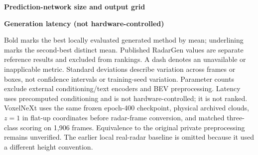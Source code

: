 \begin{table}[t]
\textbf{Prediction-network size and output grid}\par\smallskip
{}
\medskip

\textbf{Generation latency (not hardware-controlled)}\par\smallskip
{}
\medskip
\smallskip
\begin{minipage}{\textwidth}
\footnotesize
Bold marks the best locally evaluated generated method by mean; underlining marks the second-best distinct mean. Published RadarGen values are separate reference results and excluded from rankings. A dash denotes an unavailable or inapplicable metric. Standard deviations describe variation across frames or boxes, not confidence intervals or training-seed variation. Parameter counts exclude external conditioning/text encoders and BEV preprocessing. Latency uses precomputed conditioning and is not hardware-controlled; it is not ranked. VoxelNeXt uses the same frozen epoch-400 checkpoint, physical archived clouds, $z=1$ in flat-up coordinates before radar-frame conversion, and matched three-class scoring on 1,906 frames. Equivalence to the original private preprocessing remains unverified. The earlier local real-radar baseline is omitted because it used a different height convention.
\end{minipage}
\end{table}

